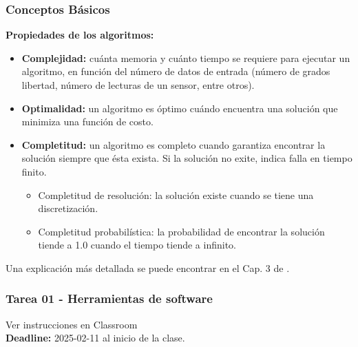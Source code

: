\begin{frame}\frametitle{Conceptos Básicos}
  \textbf{Propiedades de los algoritmos:}
  \begin{itemize}
  \item \textbf{Complejidad:} cuánta memoria y cuánto tiempo se requiere para ejecutar un algoritmo, en función del número de datos de entrada (número de grados libertad, número de lecturas de un sensor, entre otros).
  \item \textbf{Optimalidad:} un algoritmo es óptimo cuándo encuentra una solución que minimiza una función de costo.
  \item \textbf{Completitud:} un algoritmo es completo cuando garantiza encontrar la solución siempre que ésta exista. Si la solución no exite, indica falla en tiempo finito.
    \begin{itemize}
    \item Completitud de resolución: la solución existe cuando se tiene una discretización. 
    \item Completitud probabilística: la probabilidad de encontrar la solución tiende a 1.0 cuando el tiempo tiende a infinito.
    \end{itemize}
  \end{itemize}
  Una explicación más detallada se puede encontrar en el Cap. 3 de \cite{choset2005principles}.
\end{frame}

\begin{frame}[containsverbatim]\frametitle{Tarea 01 - Herramientas de software}
  Ver instrucciones en Classroom
  \[\]
  \textbf{Deadline: } 2025-02-11 al inicio de la clase. 
\end{frame}

